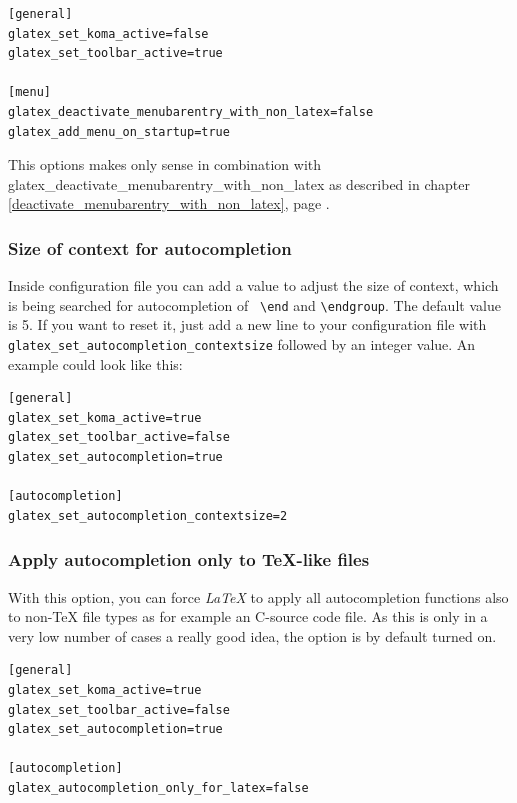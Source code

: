 \documentclass[%
paper=a4,%
fontsize=11pt,%
twoside=false,%
DIV18,%
headsepline,%
plainheadsepline,%
footsepline,%
plainfootsepline,%
bibliography=totoc,%
listof=totoc,%
BCOR10mm,%
parskip=half,%
openany,%
]{scrartcl}
\begin{document}
\begin{lstlisting}[caption={Configuration add \LaTeX{} menu on startup of Geany}]
[general]
glatex_set_koma_active=false
glatex_set_toolbar_active=true

[menu]
glatex_deactivate_menubarentry_with_non_latex=false
glatex_add_menu_on_startup=true
\end{lstlisting}

This options makes only sense in combination with
glatex\_deactivate\_menubarentry\_with\_non\_latex
as described in chapter \ref{deactivate_menubarentry_with_non_latex},
page \pageref {deactivate_menubarentry_with_non_latex}.

\subsubsection{Size of context for autocompletion}
\label{sec:hidden_pref_autocompletion_context}
Inside configuration file you can add a value to adjust the size of
context, which is being searched for autocompletion of \texttt{
\textbackslash{}end} and \texttt{\textbackslash{}endgroup}. The
default value is 5. If you want to reset it, just add a new line to
your configuration file with
\texttt{glatex\_set\_autocompletion\_contextsize} followed by an integer
value. An example could look like this:

\begin{lstlisting}[caption={Example configuration for contextsize of autocompletion}]
[general]
glatex_set_koma_active=true
glatex_set_toolbar_active=false
glatex_set_autocompletion=true

[autocompletion]
glatex_set_autocompletion_contextsize=2
\end{lstlisting}

\subsubsection{Apply autocompletion only to \TeX{}-like files}
With this option, you can force \textit{LaTeX} to apply all autocompletion functions also to non-\TeX{} file types as for example an C-source code file. As this is only in a very low number of cases a really good idea, the option is by default turned on.

\begin{lstlisting}[caption={general.conf example for deactivating file %
						   type specific restrictions for autocompletion}]
[general]
glatex_set_koma_active=true
glatex_set_toolbar_active=false
glatex_set_autocompletion=true

[autocompletion]
glatex_autocompletion_only_for_latex=false
\end{lstlisting}
\end{document}
